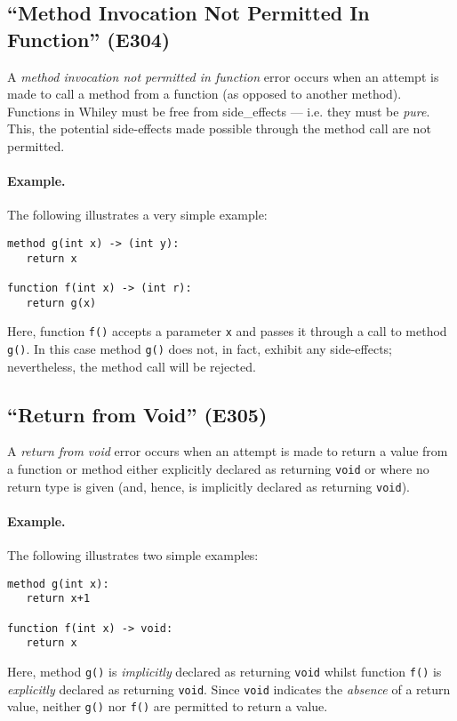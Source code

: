 \subsection{``Method Invocation Not Permitted In Function'' (E304)}

A {\em method invocation not permitted in function} error occurs when an attempt is made to call a method from a function (as opposed to another method).  Functions in Whiley must be free from \glspl{side_effect} --- i.e. they must be {\em pure}.  This, the potential side-effects made possible through the method call are not permitted.

\paragraph{Example.}  The following illustrates a very simple example:

\begin{lstlisting}
method g(int x) -> (int y):
   return x

function f(int x) -> (int r):
   return g(x)
\end{lstlisting}

Here, function \lstinline{f()} accepts a parameter \lstinline{x} and passes it through a call to method \lstinline{g()}.  In this case method \lstinline{g()} does not, in fact, exhibit any side-effects; nevertheless, the method call will be rejected.

\subsection{``Return from Void'' (E305)}

A {\em return from void} error occurs when an attempt is made to return a value from a function or method either explicitly declared as returning \lstinline{void} or where no return type is given (and, hence, is implicitly declared as returning \lstinline{void}).

\paragraph{Example.}  The following illustrates two simple examples:

\begin{lstlisting}
method g(int x):
   return x+1

function f(int x) -> void:
   return x
\end{lstlisting}

Here, method \lstinline{g()} is {\em implicitly} declared as returning \lstinline{void} whilst function \lstinline{f()} is {\em explicitly} declared as returning \lstinline{void}.  Since \lstinline{void} indicates the {\em absence} of a return value, neither \lstinline{g()} nor \lstinline{f()} are permitted to return a value.

